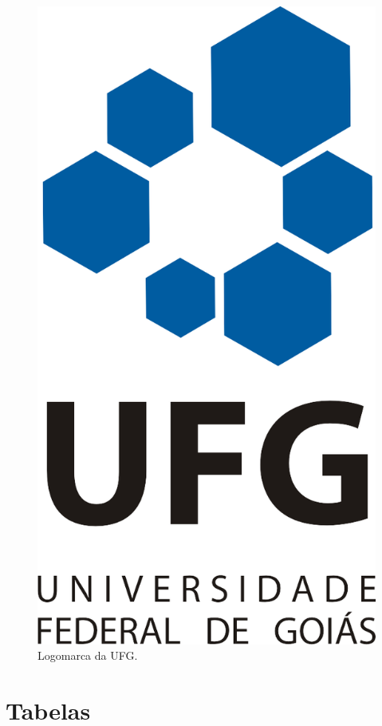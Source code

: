 \documentclass{templateppgmo}
\numberwithin{figure}{chapter}
\numberwithin{table}{chapter}
\numberwithin{quadro}{chapter}
\numberwithin{algoritmo}{chapter}
\numberwithin{codigo}{chapter}
\begin{document}
\begin{figure}[H]
\caption{Logomarca da UFG.}
\label{figura:logomarca_ufg}
\centering
\includegraphics{figuras/prioritaria_tipo1}
\end{figure}


\section{Tabelas \label{secao:tabelas_e_quadros}}
\end{document}
